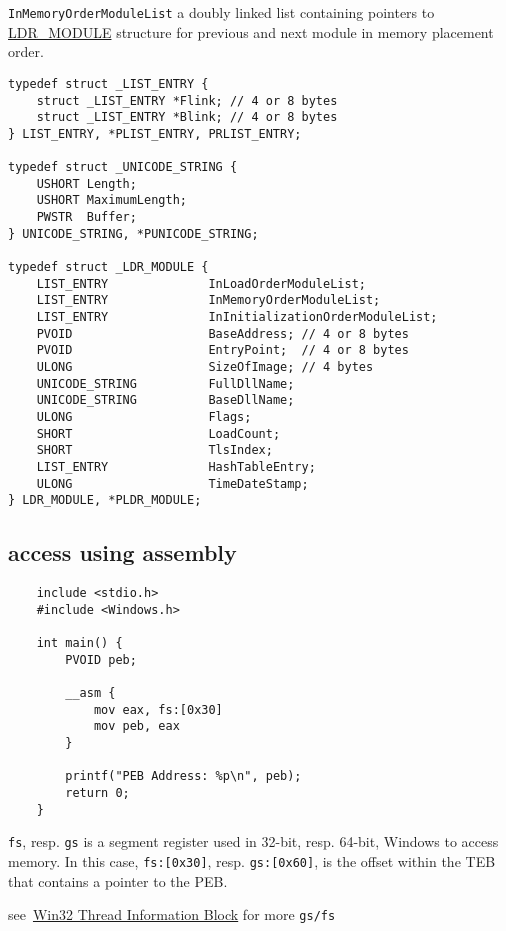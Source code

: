 \verb+InMemoryOrderModuleList+ a doubly linked list containing pointers to \href{http://undocumented.ntinternals.net/index.html?page=UserMode%2FUndocumented%20Functions%2FNT%20Objects%2FProcess%2FPEB.html}{LDR\_MODULE} structure for previous and next module in memory placement order.

\begin{verbatim}
typedef struct _LIST_ENTRY {
    struct _LIST_ENTRY *Flink; // 4 or 8 bytes
    struct _LIST_ENTRY *Blink; // 4 or 8 bytes
} LIST_ENTRY, *PLIST_ENTRY, PRLIST_ENTRY;

typedef struct _UNICODE_STRING {
    USHORT Length;
    USHORT MaximumLength;
    PWSTR  Buffer;
} UNICODE_STRING, *PUNICODE_STRING;

typedef struct _LDR_MODULE {
    LIST_ENTRY              InLoadOrderModuleList;
    LIST_ENTRY              InMemoryOrderModuleList;
    LIST_ENTRY              InInitializationOrderModuleList;
    PVOID                   BaseAddress; // 4 or 8 bytes
    PVOID                   EntryPoint;  // 4 or 8 bytes
    ULONG                   SizeOfImage; // 4 bytes
    UNICODE_STRING          FullDllName;
    UNICODE_STRING          BaseDllName;
    ULONG                   Flags;
    SHORT                   LoadCount;
    SHORT                   TlsIndex;
    LIST_ENTRY              HashTableEntry;
    ULONG                   TimeDateStamp;
} LDR_MODULE, *PLDR_MODULE;
\end{verbatim}


\subsection{access using assembly}

\begin{verbatim}
    include <stdio.h>
    #include <Windows.h>
    
    int main() {
        PVOID peb;
    
        __asm {
            mov eax, fs:[0x30]
            mov peb, eax
        }
    
        printf("PEB Address: %p\n", peb);
        return 0;
    }
\end{verbatim}

\verb+fs+, resp. \verb+gs+ is a segment register used in 32-bit, resp. 64-bit, Windows to access memory. In this case, \verb+fs:[0x30]+, resp. \verb+gs:[0x60]+,  is the offset within the TEB that contains a pointer to the PEB.

see~\href{https://en.wikipedia.org/wiki/Win32_Thread_Information_Block}{Win32 Thread Information Block} for more \verb+gs/fs+

